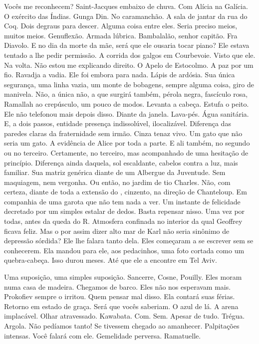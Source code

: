 Vocês me reconhecem? Saint-Jacques embaixo de chuva. Com Alícia na
Galícia. O exército das Índias. Gunga Din. No caramanchão. A sala de
jantar da rua do Coq. Dois degraus para descer. Alguma coisa entre eles.
Seria preciso meios, muitos meios. Genuflexão. Armada lúbrica.
Bambalalão, senhor capitão. Fra Diavolo. E no dia da morte da mãe, será
que ele ousaria tocar piano? Ele estava tentado a lhe pedir permissão. A
corrida dos galgos em Courbevoie. Visto que ele. Na volta. Não estou me
explicando direito. O Apelo de Estocolmo. A paz por um fio. Ravadja a
vadia. Ele foi embora para nada. Lápis de ardósia. Sua única segurança,
uma linha vazia, um monte de bobagens, sempre alguma coisa, giro de
manivela. Não, a única não, a que surgirá também, pérola negra,
fascículo rosa, Ramallah ao crepúsculo, um pouco de modos. Levanta a
cabeça. Estufa o peito. Ele não telefonou mais depois disso. Diante da
janela. Lava-pés. Água sanitária. E, a dois passos, entidade presença
indissolúvel, ilocalizável. Diferença das paredes claras da fraternidade
sem irmão. Cinza tenaz vivo. Um gato que não seria um gato. A evidência
de Alice por toda a parte. E ali também, no segundo ou no terceiro.
Certamente, no terceiro, mas acompanhado de uma hesitação de princípio.
Diferença ainda daquela, sol escaldante, cabelos contra a luz, mais
familiar. Sua matriz genérica diante de um Albergue da Juventude. Sem
maquiagem, nem vergonha. Ou então, no jardim de tio Charles. Não, com
certeza, diante de toda a extensão do , cinzento, na direção de
Chanteloup. Em companhia de uma garota que não tem nada a ver. Um
instante de felicidade decretado por um simples estalar de dedos. Basta
repensar nisso. Uma vez por todas, antes da queda do R. Atmosfera
confinada no interior da qual Geoffrey ficava feliz. Mas o por assim
dizer alto mar de Karl não seria sinônimo de depressão sórdida? Ele lhe
falara tanto dela. Eles começaram a se escrever sem se conhecerem. Ela
mandou para ele, aos pedacinhos, uma foto cortada como um quebra-cabeça.
Isso durou meses. Até que ele a encontre em Tel Aviv.

Uma suposição, uma simples suposição. Sancerre, Cosne, Pouilly. Eles
moram numa casa de madeira. Chegamos de barco. Eles não nos esperavam
mais. Prokofiev sempre o irritou. Quem pensar mal disso. Ela contará
suas férias. Retorno em estado de graça. Será que vocês saberiam. O azul
de lá. A arena implacável. Olhar atravessado. Kawabata. Com. Sem. Apesar
de tudo. Trégua. Argola. Não pedíamos tanto! Se tivessem chegado ao
amanhecer. Palpitações intensas. Você falará com ele. Gemelidade
perversa. Ramatuelle.

